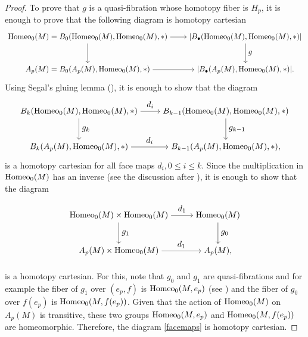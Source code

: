 \documentclass[a4paper]{amsart}
\theoremstyle{definition}
\theoremstyle{remark}
\newcommand{\tH}{\text{\textnormal{Homeo}}}
\numberwithin{equation}{section}
\begin{document}
\begin{proof}
To prove that $g$ is a quasi-fibration whose homotopy fiber is $H_p$, it is enough to prove that the following diagram is homotopy cartesian
{\Small\[
 \begin{tikzpicture}[node distance=7.2cm, auto]
  \node (B) {$\tH_0(M)=B_{0}(\tH_0(M),\tH_0(M),*)$};
  \node (C) [below of= B, node distance=1.5cm] {$A_p(M)=B_{0}(A_p(M),\tH_0(M),*)$};  
    \node (E) [right of= B] {$|B_{\bullet}(\tH_0(M),\tH_0(M),*)|$};
  \node (F) [right of= C] {$|B_{\bullet}(A_p(M),\tH_0(M),*)|.$};  
  \draw [->] (B) to node {$$}(E);
  \draw [->] (C) to node {$$}(F);
  \draw [->] (B) to node {$$} (C);
  \draw [->] (E) to node {$g$} (F);
\end{tikzpicture}
\]}
Using Segal's gluing lemma (\cite[Proposition 1.6]{MR0353298}), it is enough to show that the diagram
\[
 \begin{tikzpicture}[node distance=6.2cm, auto]
  \node (B) {$B_{k}(\tH_0(M),\tH_0(M),*)$};
  \node (C) [below of= B, node distance=1.5cm] {$B_{k}(A_p(M),\tH_0(M),*)$};  
    \node (E) [right of= B] {$B_{k-1}(\tH_0(M),\tH_0(M),*)$};
  \node (F) [right of= C] {$B_{k-1}(A_p(M),\tH_0(M),*),$};  
  \draw [->] (B) to node {$d_i$}(E);
  \draw [->] (C) to node {$d_i$}(F);
  \draw [->] (B) to node {$g_k$} (C);
  \draw [->] (E) to node {$g_{k-1}$} (F);
\end{tikzpicture}
\]
is a homotopy cartesian for all face maps $d_i, 0\leq i\leq k$. Since the multiplication in $\tH_0(M)$ has an inverse (see the discussion after \cite[Proposition 1.6]{MR0353298}), it is enough to show that the diagram

\begin{equation}\label{facemaps}
\begin{gathered}
 \begin{tikzpicture}[node distance=4.2cm, auto]
  \node (B) {$\tH_0(M)\times\tH_0(M)$};
  \node (C) [below of= B, node distance=1.5cm] {$A_p(M)\times\tH_0(M)$};  
    \node (E) [right of= B] {$\tH_0(M)$};
  \node (F) [right of= C] {$A_p(M),$};  
  \draw [->] (B) to node {$d_1$}(E);
  \draw [->] (C) to node {$d_1$}(F);
  \draw [->] (B) to node {$g_1$} (C);
  \draw [->] (E) to node {$g_0$} (F);
\end{tikzpicture}
\end{gathered}
\end{equation}

is a homotopy cartesian. For this, note that $g_0$ and $g_1$ are quasi-fibrations and for example the fiber of $g_1$ over $(e_p,f)$ is $\tH_0(M,e_p)$ (see ) and the fiber of $g_0$ over $f(e_p)$ is $\tH_0(M,f(e_p))$. Given that the action of $\tH_0(M)$ on $A_p(M)$ is transitive, these two groups $\tH_0(M,e_p)$ and $\tH_0(M,f(e_p))$ are homeomorphic. Therefore, the diagram \ref{facemaps} is homotopy cartesian.
\end{proof}
\end{document}
